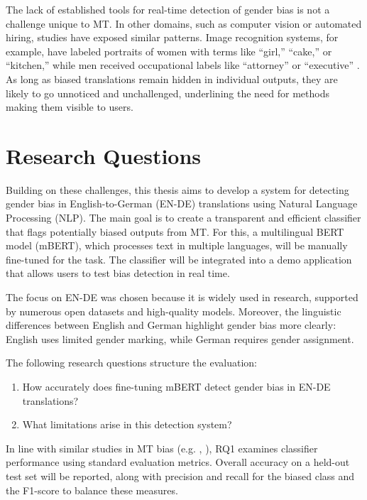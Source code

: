    The lack of established tools for real-time detection of gender bias is not a challenge unique to MT. In other domains, such as computer vision or automated hiring, studies have exposed similar patterns. Image recognition systems, for example, have labeled portraits of women with terms like “girl,” “cake,” or “kitchen,” while men received occupational labels like “attorney” or “executive” \parencite{schwemmerDiagnosingGenderBias2020}. As long as biased translations remain hidden in individual outputs, they are likely to go unnoticed and unchallenged, underlining the need for methods making them visible to users.

\section{Research Questions}
  Building on these challenges, this thesis aims to develop a system for detecting gender bias in English-to-German (EN-DE) translations using Natural Language Processing (NLP). The main goal is to create a transparent and efficient classifier that flags potentially biased outputs from MT. For this, a multilingual BERT model (mBERT), which processes text in multiple languages, will be manually fine-tuned for the task. The classifier will be integrated into a demo application that allows users to test bias detection in real time.

    The focus on EN-DE was chosen because it is widely used in research, supported by numerous open datasets and high-quality models. Moreover, the linguistic differences between English and German highlight gender bias more clearly: English uses limited gender marking, while German requires gender assignment.

    The following research questions structure the evaluation:

    \begin{enumerate}[label=\textbf{RQ\arabic*:}]
    \item How accurately does fine-tuning mBERT detect gender bias in EN-DE translations?
    \item What limitations arise in this detection system?
    \end{enumerate}

    In line with similar studies in MT bias (e.g. \textcite{smacchiaDoesAIReflect2024}, \textcite{rescignoGenderBiasMachine2023}), RQ1 examines classifier performance using standard evaluation metrics. Overall accuracy on a held-out test set will be reported, along with precision and recall for the biased class and the F1-score to balance these measures. 
    

